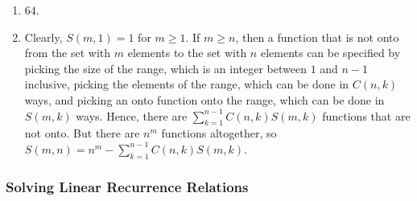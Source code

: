 \documentclass{../../cls/sig-alternate-05-2015}
\begin{document}
\begin{enumerate}
\item $64$.

\item  Clearly, $S(m, 1) = 1$ for $m \geq 1$. If $m \geq n$, then a function that
is not onto from the set with $m$ elements to the set with $n$
elements can be specified by picking the size of the range,
which is an integer between $1$ and $n - 1$ inclusive, picking
the elements of the range, which can be done in $C(n, k)$ ways,
and picking an onto function onto the range, which can be
done in $S(m, k)$ ways. Hence, there are $\sum_{k=1}^{n-1} C(n, k)S(m, k)$
functions that are not onto. But there are $n^m$ functions
altogether, so $S(m, n) = n^m - \sum_{k=1}^{n-1} C(n, k)S(m, k)$.

\end{enumerate}

\subsubsection{Solving Linear Recurrence Relations}
\end{document}
